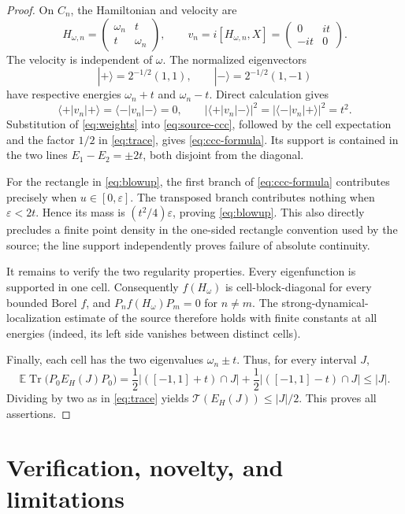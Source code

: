 \documentclass[10pt]{article}
\newcommand{\E}{\mathbb E}
\begin{document}
\begin{proof}
On $C_n$, the Hamiltonian and velocity are
\[
 H_{\omega,n}=\begin{pmatrix}\omega_n&t\\t&\omega_n\end{pmatrix},
 \qquad
 v_n=i[H_{\omega,n},X]
   =\begin{pmatrix}0&it\\-it&0\end{pmatrix}.
\]
The velocity is independent of $\omega$. The normalized eigenvectors
\[
 |+\rangle=2^{-1/2}(1,1),\qquad
 |-\rangle=2^{-1/2}(1,-1)
\]
have respective energies $\omega_n+t$ and $\omega_n-t$. Direct calculation
gives
\begin{equation}\label{eq:weights}
 \langle+|v_n|+\rangle=\langle-|v_n|-\rangle=0,
 \qquad
 |\langle+|v_n|-\rangle|^2
 =|\langle-|v_n|+\rangle|^2=t^2.
\end{equation}
Substitution of \eqref{eq:weights} into \eqref{eq:source-ccc}, followed by the
cell expectation and the factor $1/2$ in \eqref{eq:trace}, gives
\eqref{eq:ccc-formula}. Its support is contained in the two lines
$E_1-E_2=\pm2t$, both disjoint from the diagonal.

For the rectangle in \eqref{eq:blowup}, the first branch of
\eqref{eq:ccc-formula} contributes precisely when $u\in[0,\varepsilon]$.
The transposed branch contributes nothing when $\varepsilon<2t$. Hence its
mass is $(t^2/4)\varepsilon$, proving \eqref{eq:blowup}. This also directly
precludes a finite point density in the one-sided rectangle convention used
by the source; the line support independently proves failure of absolute
continuity.

It remains to verify the two regularity properties. Every eigenfunction is
supported in one cell. Consequently $f(H_\omega)$ is cell-block-diagonal for
every bounded Borel $f$, and $P_n f(H_\omega)P_m=0$ for $n\ne m$. The
strong-dynamical-localization estimate of the source therefore holds with
finite constants at all energies (indeed, its left side vanishes between
distinct cells).

Finally, each cell has the two eigenvalues $\omega_n\pm t$. Thus, for every
interval $J$,
\[
 \E\operatorname{Tr}\bigl(P_0E_H(J)P_0\bigr)
 =\frac12|([-1,1]+t)\cap J|+\frac12|([-1,1]-t)\cap J|
 \le |J|.
\]
Dividing by two as in \eqref{eq:trace} yields
$\mathcal T(E_H(J))\le |J|/2$. This proves all assertions.
\end{proof}

\section{Verification, novelty, and limitations}
\end{document}
